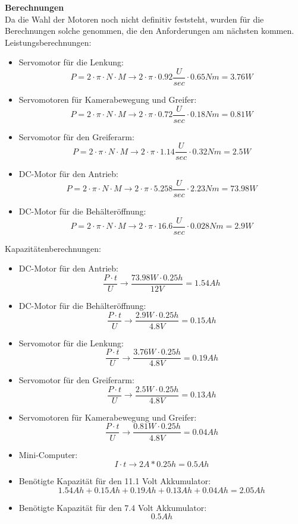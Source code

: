 \textbf{Berechnungen}\\[0.2cm]
Da die Wahl der Motoren noch nicht definitiv feststeht, wurden für die Berechnungen solche genommen, die den Anforderungen am nächsten kommen.\\
Leistungsberechnungen:
\begin{itemize}
\item Servomotor für die Lenkung:
\[
P=2\cdot \pi\cdot N\cdot M \to 2\cdot \pi\cdot 0.92\frac{U}{sec}\cdot 0.65Nm = 3.76W
\]
\item Servomotoren für Kamerabewegung und Greifer:
\[
P=2\cdot \pi\cdot N\cdot M \to 2\cdot \pi\cdot 0.72\frac{U}{sec}\cdot 0.18Nm = 0.81W
\]
\item Servomotor für den Greiferarm:
\[
P=2\cdot \pi\cdot N\cdot M \to 2\cdot \pi\cdot 1.14\frac{U}{sec}\cdot 0.32Nm = 2.5W
\]
\item DC-Motor für den Antrieb:
\[
P=2\cdot \pi\cdot N\cdot M \to 2\cdot \pi\cdot 5.258\frac{U}{sec}\cdot 2.23Nm = 73.98W
\]
\item DC-Motor für die Behälteröffnung:
\[
P=2\cdot \pi\cdot N\cdot M \to 2\cdot \pi\cdot 16.6\frac{U}{sec}\cdot 0.028Nm = 2.9W
\]
\end{itemize}
Kapazitätenberechnungen:
\begin{itemize}
\item DC-Motor für den Antrieb:
\[
\frac{P\cdot t}{U} \to \frac{73.98W\cdot0.25h}{12V}= 1.54 Ah
\]
\item DC-Motor für die Behälteröffnung:
\[
\frac{P\cdot t}{U} \to \frac{2.9W\cdot0.25h}{4.8V}= 0.15 Ah
\]
\item Servomotor für die Lenkung:
\[
\frac{P\cdot t}{U} \to \frac{3.76W\cdot0.25h}{4.8V}= 0.19 Ah
\]
\item Servomotor für den Greiferarm:
\[
\frac{P\cdot t}{U} \to \frac{2.5W\cdot0.25h}{4.8V}= 0.13 Ah
\]
\item Servomotoren für Kamerabewegung und Greifer:
\[
\frac{P\cdot t}{U} \to \frac{0.81W\cdot0.25h}{4.8V}= 0.04 Ah
\]
\item Mini-Computer:
\[
I\cdot t \to 2A*0.25h = 0.5 Ah
\]
\item Benötigte Kapazität für den 11.1 Volt Akkumulator:
\[
1.54Ah+0.15Ah+0.19Ah+0.13Ah+0.04Ah = 2.05Ah
\]
\item Benötigte Kapazität für den 7.4 Volt Akkumulator:
\[
0.5Ah
\]
\end{itemize}
